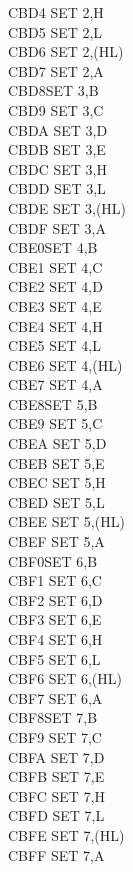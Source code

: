 \documentclass[twoside,openright,a4paper]{book}
\begin{document}
\begin{multicols}{3}
{\begin{tabbing}
	CBD4\> 	SET 2,H\\
	CBD5\> 	SET 2,L\\
	CBD6\> 	SET 2,(HL)\\
	CBD7\> 	SET 2,A\\
	CBD8\>SET 3,B\\
	CBD9\> 	SET 3,C\\
	CBDA\> 	SET 3,D\\
	CBDB\> 	SET 3,E\\
	CBDC\> 	SET 3,H\\
	CBDD\> 	SET 3,L\\
	CBDE\> 	SET 3,(HL)\\
	CBDF\> 	SET 3,A\\
	CBE0\>SET 4,B\\
	CBE1\> 	SET 4,C\\
	CBE2\> 	SET 4,D\\
	CBE3\> 	SET 4,E\\
	CBE4\> 	SET 4,H\\
	CBE5\> 	SET 4,L\\
	CBE6\> 	SET 4,(HL)\\
	CBE7\> 	SET 4,A\\
	CBE8\>SET 5,B\\
	CBE9\> 	SET 5,C\\
	CBEA\> 	SET 5,D\\
	CBEB\> 	SET 5,E\\
	CBEC\> 	SET 5,H\\
	CBED\> 	SET 5,L\\
	CBEE\> 	SET 5,(HL)\\
	CBEF\> 	SET 5,A\\
	CBF0\>SET 6,B\\
	CBF1\> 	SET 6,C\\
	CBF2\> 	SET 6,D\\
	CBF3\> 	SET 6,E\\
	CBF4\> 	SET 6,H\\
	CBF5\> 	SET 6,L\\
	CBF6\> 	SET 6,(HL)\\
	CBF7\> 	SET 6,A\\
	CBF8\>SET 7,B\\
	CBF9\> 	SET 7,C\\
	CBFA\> 	SET 7,D\\
	CBFB\> 	SET 7,E\\
	CBFC\> 	SET 7,H\\
	CBFD\> 	SET 7,L\\
	CBFE\> 	SET 7,(HL)\\
	CBFF\> 	SET 7,A\\

\end{tabbing}}
\end{multicols}
\end{document}
